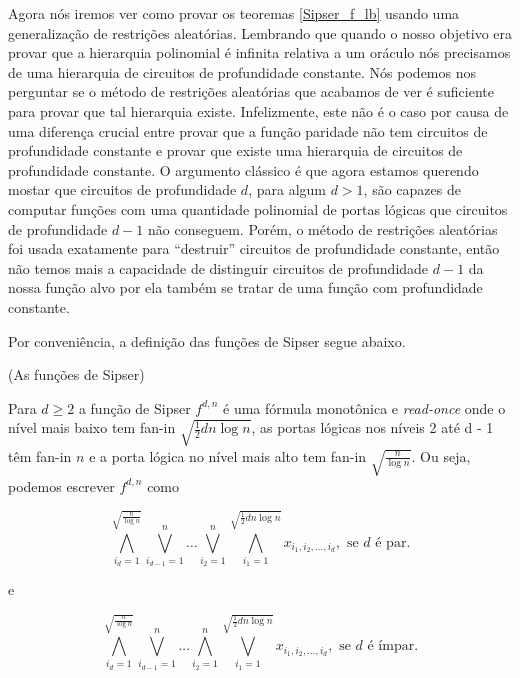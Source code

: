 Agora nós iremos ver como provar os teoremas \ref{Sipser_f_lb} usando uma generalização de restrições aleatórias. Lembrando que quando o nosso objetivo era provar que a hierarquia polinomial é infinita relativa a um oráculo nós precisamos de uma hierarquia de circuitos de profundidade constante. Nós podemos nos perguntar se o método de restrições aleatórias que acabamos de ver é suficiente para provar que tal hierarquia existe. Infelizmente, este não é o caso por causa de uma diferença crucial entre provar que a função paridade não tem circuitos de profundidade constante e provar que existe uma hierarquia de circuitos de profundidade constante. O argumento clássico é que agora estamos querendo mostar que circuitos de profundidade $d$, para algum $d > 1$, são capazes de computar funções com uma quantidade polinomial de portas lógicas que circuitos de profundidade $d - 1$ não conseguem. Porém, o método de restrições aleatórias foi usada exatamente para ``destruir'' circuitos de profundidade constante, então não temos mais a capacidade de distinguir circuitos de profundidade $d - 1$ da nossa função alvo por ela também se tratar de uma função com profundidade constante. 

Por conveniência, a definição das funções de Sipser segue abaixo.

\begin{defi} (As funções de Sipser)

Para $d \geq 2$ a função de Sipser $f^{d, n}$ é uma fórmula monotônica e \emph{read-once} onde o nível mais baixo tem fan-in $\sqrt{\frac{1}{2}dn\log n}$, as portas lógicas nos níveis 2 até d - 1 têm fan-in $n$ e a porta lógica no nível mais alto tem fan-in $\sqrt{\frac{n}{\log n}}$. Ou seja, podemos escrever $f^{d, n}$ como

\begin{equation} \label{Sipser_f_def_1}
	\bigwedge_{i_{d}  = 1}^{\sqrt{\frac{n}{\log n}}}\bigvee_{i_{d - 1} = 1}^{n} \dots \bigvee_{i_{2} = 1}^{n} \bigwedge_{i_{1} = 1}^{\sqrt{\frac{1}{2}dn\log n}} x_{i_{1}, i_{2}, \dots, i_{d}}, \text{ se } d \text{ é par.}
\end{equation}

e

\begin{equation}
	\bigwedge_{i_{d}  = 1}^{\sqrt{\frac{n}{\log n}}}\bigvee_{i_{d - 1} = 1}^{n} \dots \bigwedge_{i_{2} = 1}^{n} \bigvee_{i_{1} = 1}^{\sqrt{\frac{1}{2}dn\log n}} x_{i_{1}, i_{2}, \dots, i_{d}}, \text{ se } d \text{ é ímpar.}
\end{equation}


\end{defi}

